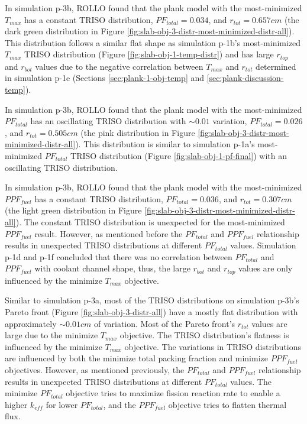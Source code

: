 In simulation p-3b, \gls{ROLLO} found that the plank model with the most-minimized 
$T_{max}$ has a constant TRISO distribution, $PF_{total} = 0.034$, and $r_{tot}=0.657cm$ 
(the dark green distribution in Figure 
\ref{fig:slab-obj-3-distr-most-minimized-distr-all}).
This distribution follows a similar flat shape as simulation p-1b's most-minimized 
$T_{max}$ TRISO distribution (Figure \ref{fig:slab-obj-1-temp-distr}) and has large 
$r_{top}$ and $r_{bot}$ values due to the negative correlation between $T_{max}$ 
and $r_{tot}$ determined in simulation p-1e (Sections \ref{sec:plank-1-obj-temp} and 
\ref{sec:plank-discussion-temp}). 

In simulation p-3b, \gls{ROLLO} found that the plank model with the most-minimized 
$PF_{total}$ has an oscillating TRISO distribution with $\sim0.01$ variation,
$PF_{total} = 0.026$, and $r_{tot}=0.505cm$
(the pink distribution in Figure \ref{fig:slab-obj-3-distr-most-minimized-distr-all}).
This distribution is similar to simulation p-1a's most-minimized $PF_{total}$ TRISO 
distribution (Figure \ref{fig:slab-obj-1-pf-final}) with an oscillating TRISO 
distribution.

In simulation p-3b, \gls{ROLLO} found that the plank model with the most-minimized 
$PPF_{fuel}$ has a constant TRISO distribution, $PF_{total} = 0.036$, and 
$r_{tot}=0.307cm$ (the light green distribution in Figure 
\ref{fig:slab-obj-3-distr-most-minimized-distr-all}).
The constant TRISO distribution is unexpected for the most-minimized $PPF_{fuel}$ result. 
However, as mentioned before the $PF_{total}$ and $PPF_{fuel}$ relationship
results in unexpected TRISO distributions at different $PF_{total}$ values. 
Simulation p-1d and p-1f concluded that there was no correlation between $PF_{total}$ 
and $PPF_{fuel}$ with coolant channel shape, thus, the large $r_{bot}$ and $r_{top}$ 
values are only influenced by the minimize $T_{max}$ objective. 

Similar to simulation p-3a, most of the \gls{TRISO} distributions on simulation 
p-3b's Pareto front (Figure \ref{fig:slab-obj-3-distr-all}) have a mostly flat 
distribution with approximately $\sim0.01cm$ of variation. 
Most of the Pareto front's $r_{tot}$ values are large due to the minimize $T_{max}$ 
objective. 
The TRISO distribution's flatness is influenced by the minimize $T_{max}$ objective. 
The variations in \gls{TRISO} distributions are influenced by both the minimize 
total packing fraction and minimize $PPF_{fuel}$ objectives. 
However, as mentioned previously, the $PF_{total}$ and $PPF_{fuel}$ relationship
results in unexpected TRISO distributions at different $PF_{total}$ values. 
The minimize $PF_{total}$ objective tries to maximize fission reaction rate
to enable a higher $k_{eff}$ for lower $PF_{total}$, and 
the $PPF_{fuel}$ objective tries to flatten thermal flux. 

